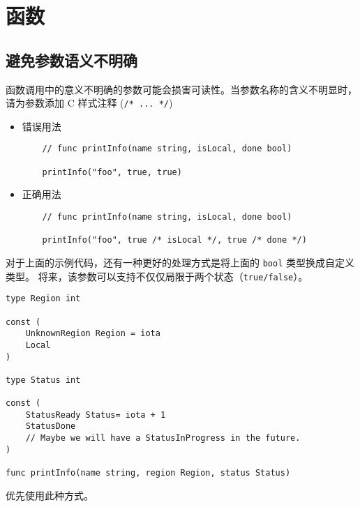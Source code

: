 \chapter{函数}
\section{避免参数语义不明确}
函数调用中的意义不明确的参数可能会损害可读性。当参数名称的含义不明显时，请为参数添加 C 样式注释 (\texttt{/* ... */})
\begin{itemize}[leftmargin=4em]
\item 错误用法

  \begin{verbatim}
    // func printInfo(name string, isLocal, done bool)

    printInfo("foo", true, true)
  \end{verbatim}
\item 正确用法

  \begin{verbatim}
    // func printInfo(name string, isLocal, done bool)

    printInfo("foo", true /* isLocal */, true /* done */)
  \end{verbatim}
\end{itemize}

对于上面的示例代码，还有一种更好的处理方式是将上面的 \texttt{bool} 类型换成自定义类型。
将来，该参数可以支持不仅仅局限于两个状态（\texttt{true/false}）。
\begin{verbatim}
type Region int

const (
	UnknownRegion Region = iota
	Local
)

type Status int

const (
	StatusReady Status= iota + 1
	StatusDone
	// Maybe we will have a StatusInProgress in the future.
)

func printInfo(name string, region Region, status Status)
\end{verbatim}

优先使用此种方式。

